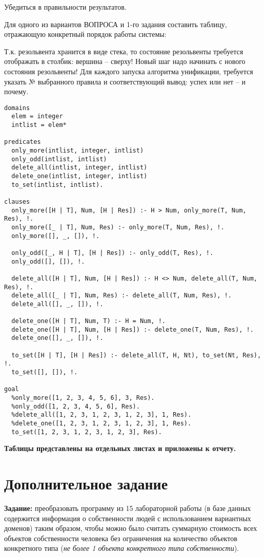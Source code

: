 Убедиться в правильности результатов.

Для одного из вариантов ВОПРОСА и 1-го задания составить таблицу, отражающую конкретный порядок работы системы:

Т.к. резольвента хранится в виде стека, то состояние резольвенты требуется отображать в столбик: вершина – сверху! Новый шаг надо начинать с нового состояния резольвенты! Для каждого запуска алгоритма унификации, требуется указать № выбранного правила и соответствующий вывод: успех или нет – и почему.

\begin{lstlisting}
domains
  elem = integer
  intlist = elem*

predicates
  only_more(intlist, integer, intlist)
  only_odd(intlist, intlist)
  delete_all(intlist, integer, intlist)
  delete_one(intlist, integer, intlist)
  to_set(intlist, intlist).

clauses
  only_more([H | T], Num, [H | Res]) :- H > Num, only_more(T, Num, Res), !.
  only_more([_ | T], Num, Res) :- only_more(T, Num, Res), !.
  only_more([], _, []), !.

  only_odd([_, H | T], [H | Res]) :- only_odd(T, Res), !.
  only_odd([], []), !.

  delete_all([H | T], Num, [H | Res]) :- H <> Num, delete_all(T, Num, Res), !.
  delete_all([_ | T], Num, Res) :- delete_all(T, Num, Res), !.
  delete_all([], _, []), !.

  delete_one([H | T], Num, T) :- H = Num, !.
  delete_one([H | T], Num, [H | Res]) :- delete_one(T, Num, Res), !.
  delete_one([], _, []), !.

  to_set([H | T], [H | Res]) :- delete_all(T, H, Nt), to_set(Nt, Res), !.
  to_set([], []), !.

goal
  %only_more([1, 2, 3, 4, 5, 6], 3, Res).
  %only_odd([1, 2, 3, 4, 5, 6], Res).
  %delete_all([1, 2, 3, 1, 2, 3, 1, 2, 3], 1, Res).
  %delete_one([1, 2, 3, 1, 2, 3, 1, 2, 3], 1, Res).
  to_set([1, 2, 3, 1, 2, 3, 1, 2, 3], Res).
\end{lstlisting}

\textbf{Таблицы представлены на отдельных листах и приложены к отчету.}

\chapter*{Дополнительное задание}

\textbf{Задание:} преобразовать программу из 15 лабораторной работы (в базе данных содержится информация о собственности людей с использованием вариантных доменов) таким образом, чтобы можно было считать суммарную стоимость всех объектов собственности человека без ограничения на количество объектов конкретного типа (\textit{не более 1 объекта конкретного типа собственности}).

